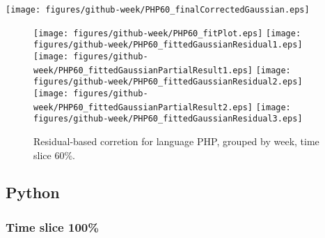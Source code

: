 \begin{center}
{\texttt{[image: figures/github-week/PHP60\_finalCorrectedGaussian.eps]}}
\end{center}

\FloatBarrier

\begin{figure}[t]
\centering
{}
{\texttt{[image: figures/github-week/PHP60\_fitPlot.eps]}}
{\texttt{[image: figures/github-week/PHP60\_fittedGaussianResidual1.eps]}}
{\texttt{[image: figures/github-week/PHP60\_fittedGaussianPartialResult1.eps]}}
{\texttt{[image: figures/github-week/PHP60\_fittedGaussianResidual2.eps]}}
{\texttt{[image: figures/github-week/PHP60\_fittedGaussianPartialResult2.eps]}}
{\texttt{[image: figures/github-week/PHP60\_fittedGaussianResidual3.eps]}}
\caption{Residual-based corretion for language PHP, grouped by week, time slice 60\%.}
\end{figure}


\FloatBarrier


\subsection{Python}

\subsubsection{Time slice 100\%}

